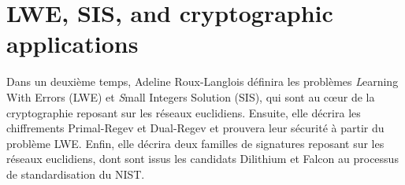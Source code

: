 \section{LWE, SIS, and cryptographic applications}

Dans un deuxième temps, Adeline Roux-Langlois définira les problèmes
{\emph Learning With Errors} (LWE)
et {\emph Small Integers Solution} (SIS), qui sont au c{\oe}ur de la
cryptographie
reposant sur les réseaux euclidiens. Ensuite, elle décrira les chiffrements
Primal-Regev et Dual-Regev et prouvera leur sécurité à partir du
problème LWE. Enfin, elle décrira deux familles de signatures reposant
sur les réseaux euclidiens, dont sont issus les candidats Dilithium et Falcon
au processus de standardisation du NIST.